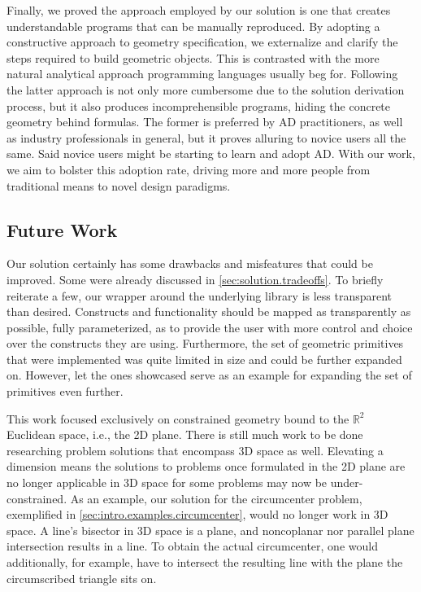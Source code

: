 Finally, we proved the approach employed by our solution is one that creates
understandable programs that can be manually reproduced.  By adopting a
constructive approach to geometry specification, we externalize and clarify the
steps required to build geometric objects.  This is contrasted with the more
natural analytical approach programming languages usually beg for.  Following
the latter approach is not only more cumbersome due to the solution derivation
process, but it also produces incomprehensible programs, hiding the concrete
geometry behind formulas.  The former is preferred by \ac{AD} practitioners, as
well as industry professionals in general, but it proves alluring to novice
users all the same.  Said novice users might be starting to learn and adopt
\ac{AD}.  With our work, we aim to bolster this adoption rate, driving more and
more people from traditional means to novel design paradigms.

\subsection*{Future Work}

Our solution certainly has some drawbacks and misfeatures that could be
improved.  Some were already discussed in \cref{sec:solution.tradeoffs}.  To
briefly reiterate a few, our wrapper around the underlying library is less
transparent than desired.  Constructs and functionality should be mapped as
transparently as possible, fully parameterized, as to provide the user with more
control and choice over the constructs they are using.  Furthermore, the set of
geometric primitives that were implemented was quite limited in size and could
be further expanded on.  However, let the ones showcased serve as an example for
expanding the set of primitives even further.

This work focused exclusively on constrained geometry bound to the
$\mathbb{R}^2$ Euclidean space, i.e., the 2D plane.  There is still much work to
be done researching problem solutions that encompass 3D space as well.
Elevating a dimension means the solutions to problems once formulated in the 2D
plane are no longer applicable in 3D space for some problems may now be
under-constrained.  As an example, our solution for the circumcenter problem,
exemplified in \cref{sec:intro.examples.circumcenter}, would no longer work in
3D space.  A line's bisector in 3D space is a plane, and noncoplanar nor
parallel plane intersection results in a line.  To obtain the actual
circumcenter, one would additionally, for example, have to intersect the
resulting line with the plane the circumscribed triangle sits on.
